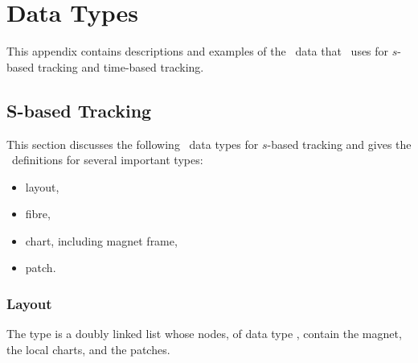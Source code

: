 
\chapter{Data Types}

This appendix contains descriptions and examples of the \Fninety\ data that \PTC\ uses for $s$-based tracking and time-based tracking.



\section{S-based Tracking}

This section discusses the following \PTC\ data types for $s$-based tracking
and gives the \Fninety\ definitions for several important types:
\begin{itemize}
  \item layout,
  \item fibre,
  \item chart, including magnet frame,
  \item patch.
\end{itemize}


\subsection{Layout}

The  type is a doubly linked list whose nodes, of data type
, contain the magnet, the local charts, and the patches.

